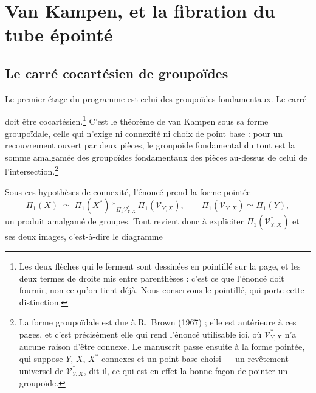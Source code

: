 \documentclass[11pt,a4paper]{article}
\begin{document}
\section*{Van Kampen, et la fibration du tube épointé}

\subsection*{Le carré cocartésien de groupoïdes}

Le premier étage du programme est celui des groupoïdes fondamentaux. Le carré


doit être cocartésien.\footnote{Les deux flèches qui le ferment sont dessinées
en pointillé sur la page, et les deux termes de droite mis entre parenthèses :
c'est ce que l'énoncé doit fournir, non ce qu'on tient déjà. Nous conservons le
pointillé, qui porte cette distinction.} C'est le théorème de van Kampen sous sa
forme groupoïdale, celle qui n'exige ni connexité ni choix de point base : pour
un recouvrement ouvert par deux pièces, le groupoïde fondamental du tout est la
somme amalgamée des groupoïdes fondamentaux des pièces au-dessus de celui de
l'intersection.\footnote{La forme groupoïdale est due à R.~Brown (1967) ; elle
est antérieure à ces pages, et c'est précisément elle qui rend l'énoncé
utilisable ici, où $\mathcal{V}^{*}_{Y,X}$ n'a aucune raison d'être connexe. Le
manuscrit passe ensuite à la forme pointée, qui suppose $Y$, $X$, $X^{*}$
connexes et un point base choisi — un revêtement universel de
$\mathcal{V}^{*}_{Y,X}$, dit-il, ce qui est en effet la bonne façon de pointer
un groupoïde.}

Sous ces hypothèses de connexité, l'énoncé prend la forme pointée
\[
  \Pi_{1}(X) \;\simeq\;
  \Pi_{1}(X^{*}) \ast_{\Pi_{1}\mathcal{V}^{*}_{Y,X}} \Pi_{1}(\mathcal{V}_{Y,X}),
  \qquad \Pi_{1}(\mathcal{V}_{Y,X}) \simeq \Pi_{1}(Y),
\]
un produit amalgamé de groupes. Tout revient donc à expliciter
$\Pi_{1}(\mathcal{V}^{*}_{Y,X})$ et ses deux images, c'est-à-dire le diagramme

\end{document}
